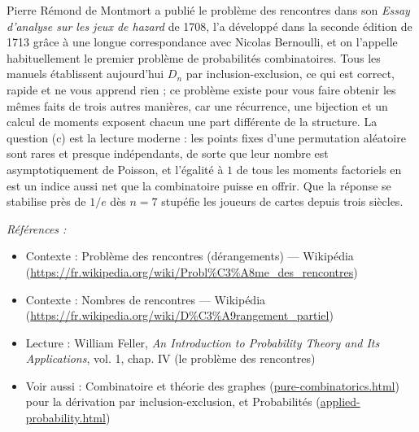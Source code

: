 \documentclass[11pt]{article}
\newenvironment{refs}{\par\small\noindent\emph{Références :}\begin{itemize}\setlength\itemsep{0pt}}{\end{itemize}\normalsize}
\begin{document}
\noindent Pierre Rémond de Montmort a publié le problème des rencontres dans son
\textit{Essay d'analyse sur les jeux de hazard} de 1708, l'a développé dans la seconde édition
de 1713 grâce à une longue correspondance avec Nicolas Bernoulli, et on l'appelle
habituellement le premier problème de probabilités combinatoires. Tous les manuels
établissent aujourd'hui $ D_n $ par inclusion-exclusion, ce qui est correct, rapide et ne
vous apprend rien ; ce problème existe pour vous faire obtenir les mêmes faits de trois
autres manières, car une récurrence, une bijection et un calcul de moments exposent chacun
une part différente de la structure. La question (c) est la lecture moderne : les points
fixes d'une permutation aléatoire sont rares et presque indépendants, de sorte que leur
nombre est asymptotiquement de Poisson, et l'égalité à $ 1 $ de tous les moments
factoriels en est un indice aussi net que la combinatoire puisse en offrir. Que la réponse
se stabilise près de $ 1/e $ dès $ n = 7 $ stupéfie les joueurs de cartes depuis trois
siècles.

\begin{refs}
\item Contexte : Problème des rencontres (dérangements) --- Wikipédia (\url{https://fr.wikipedia.org/wiki/Probl%C3%A8me_des_rencontres})
\item Contexte : Nombres de rencontres --- Wikipédia (\url{https://fr.wikipedia.org/wiki/D%C3%A9rangement_partiel})
\item Lecture : William Feller, \textit{An Introduction to Probability Theory and Its Applications}, vol. 1, chap. IV (le problème des rencontres)
\item Voir aussi : Combinatoire et théorie des graphes (\url{pure-combinatorics.html}) pour la dérivation par inclusion-exclusion, et Probabilités (\url{applied-probability.html})
\end{refs}

\bigskip
\end{document}
